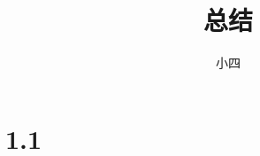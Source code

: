 \documentclass[12pt,a4paper]{article}
\title{总结}
\author{小四}
\date{\chntoday}
\numberwithin{equation}{section}
\begin{document}
\maketitle
\section{1.1}



\cite{tam19912d}

\end{document}
